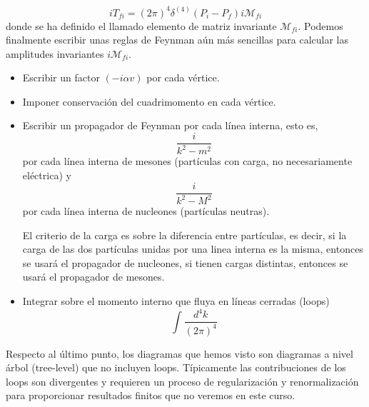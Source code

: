 \begin{equation*}
i T_{f i}=(2 \pi)^{4} \delta^{(4)}\left(P_{i}-P_{f}\right) i \mathscr{M}_{f i} \tag{7.46}
\end{equation*}
donde se ha definido el llamado elemento de matriz invariante $\mathscr{M}_{f i}$. Podemos finalmente escribir unas reglas de Feynman aún más sencillas para calcular las amplitudes invariantes $i \mathscr{M}_{f i}$. 
\begin{itemize}
  \item Escribir un factor $(-i\alpha v)$ por cada vértice.
\item Imponer conservación del cuadrimomento en cada vértice.
\item Escribir un propagador de Feynman por cada línea interna, esto es,
$$
\frac{i}{k^{2}-m^{2}}
$$
por cada línea interna de mesones (partículas con carga, no necesariamente eléctrica) y
$$
\frac{i}{k^{2}-M^{2}}
$$
por cada línea interna de nucleones (partículas neutras).

El criterio de la carga es sobre la diferencia entre partículas, es decir, si la carga de las dos partículas unidas por una linea interna es la misma, entonces se usará el propagador de nucleones, si tienen cargas distintas, entonces se usará el propagador de mesones.

\item Integrar sobre el momento interno que fluya en líneas cerradas (loops)
$$
\int \frac{d^{4} k}{(2 \pi)^{4}}
$$
\end{itemize}

Respecto al último punto, los diagramas que hemos visto son diagramas a nivel árbol (tree-level) que no incluyen loops. Típicamente las contribuciones de los loops son divergentes y requieren un proceso de regularización y renormalización para proporcionar resultados finitos que no veremos en este curso.

